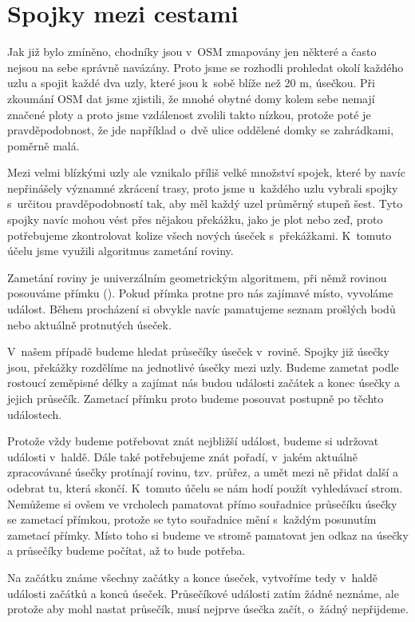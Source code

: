\section{Spojky mezi cestami}
Jak již bylo zmíněno, chodníky jsou v~OSM zmapovány jen některé a často nejsou
na sebe správně navázány. Proto jsme se rozhodli prohledat okolí každého uzlu a
spojit každé dva uzly, které jsou k~sobě blíže než 20 m, úsečkou. Při zkoumání
OSM dat jsme zjistili, že mnohé obytné domy kolem sebe nemají značené ploty a
proto jsme vzdálenost zvolili takto nízkou, protože poté je pravděpodobnost, že
jde například o~dvě ulice oddělené domky se zahrádkami, poměrně malá.  

Mezi velmi blízkými uzly ale vznikalo příliš velké množství spojek, které by
navíc nepřinášely významné zkrácení trasy, proto jsme u~každého uzlu vybrali
spojky s~určitou pravděpodobností tak, aby měl každý uzel průměrný stupeň šest.
Tyto spojky navíc mohou vést přes nějakou překážku, jako je plot nebo zeď, proto
potřebujeme zkontrolovat kolize všech nových úseček s~překážkami. K~tomuto účelu
jsme využili algoritmus zametání roviny.

Zametání roviny\cite{zametani} je univerzálním geometrickým algoritmem, při němž
rovinou posouváme přímku (). Pokud přímka protne pro nás zajímavé
místo, vyvoláme událost. Během procházení si obvykle navíc pamatujeme seznam
prošlých bodů nebo aktuálně protnutých úseček.

V~našem případě budeme hledat průsečíky úseček v~rovině. Spojky již úsečky jsou,
překážky rozdělíme na jednotlivé úsečky mezi uzly. Budeme zametat podle rostoucí
zeměpisné délky a zajímat nás budou události začátek a konec úsečky a jejich
průsečík. Zametací přímku proto budeme posouvat postupně po těchto událostech.

Protože vždy budeme potřebovat znát nejbližší událost, budeme si udržovat
události v~haldě. Dále také potřebujeme znát pořadí, v~jakém aktuálně
zpracovávané úsečky protínají rovinu, tzv. průřez, a umět mezi ně přidat další a
odebrat tu, která skončí. K~tomuto účelu se nám hodí použít vyhledávací strom.
Nemůžeme si ovšem ve vrcholech pamatovat přímo souřadnice průsečíku úsečky se
zametací přímkou, protože se tyto souřadnice mění s~každým posunutím zametací
přímky. Místo toho si budeme ve stromě pamatovat jen odkaz na úsečky a průsečíky
budeme počítat, až to bude potřeba.

Na začátku známe všechny začátky a konce úseček, vytvoříme tedy v~haldě události
začátků a konců úseček. Průsečíkové události zatím žádné neznáme, ale protože
aby mohl nastat průsečík, musí nejprve úsečka začít, o~žádný nepřijdeme. 

